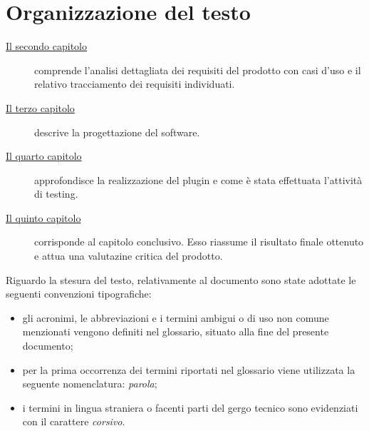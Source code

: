 \section{Organizzazione del testo}

\begin{description}
    \item[{\hyperref[cap:analisi-requisiti]{Il secondo capitolo}}] comprende l'analisi dettagliata dei requisiti del prodotto con casi d'uso e il relativo tracciamento dei requisiti individuati.
    
    \item[{\hyperref[cap:progettazione]{Il terzo capitolo}}] descrive la progettazione del software.
    
    \item[{\hyperref[cap:realizzazione-testing]{Il quarto capitolo}}] approfondisce la realizzazione del plugin e come è stata effettuata l'attività di testing.
    
    \item[{\hyperref[cap:conclusioni]{Il quinto capitolo}}] corrisponde al capitolo conclusivo. Esso riassume il risultato finale ottenuto e attua una valutazine critica del prodotto.
    
\end{description}

Riguardo la stesura del testo, relativamente al documento sono state adottate le seguenti convenzioni tipografiche:
\begin{itemize}
	\item gli acronimi, le abbreviazioni e i termini ambigui o di uso non comune menzionati vengono definiti nel glossario, situato alla fine del presente documento;
	\item per la prima occorrenza dei termini riportati nel glossario viene utilizzata la seguente nomenclatura: \emph{parola}\glsfirstoccur;
	\item i termini in lingua straniera o facenti parti del gergo tecnico sono evidenziati con il carattere \emph{corsivo}.
\end{itemize}